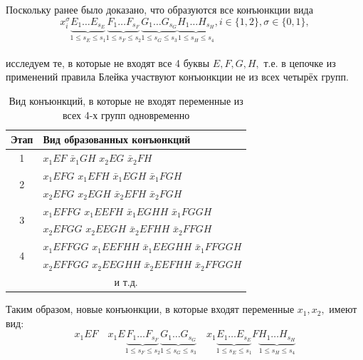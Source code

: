 \documentclass[12pt,a4paper,oneside,fleqn,leqno]{article}
\theoremstyle{definition}
\begin{document}
			Поскольку ранее было доказано, что образуются все конъюнкции вида
			\begin{equation}
				x_i^{\sigma} \underbrace{E_1\ldots E_{s_E}}_{1\leqslant s_E \leqslant s_1}\underbrace{F_1\ldots F_{s_F}}_{1\leqslant s_F \leqslant s_2}\underbrace{G_1\ldots G_{s_G}}_{1\leqslant s_G \leqslant s_3}\underbrace{H_1\ldots H_{s_H}}_{1\leqslant s_H \leqslant s_4}, i\in\{1,2\},\sigma\in\{0,1\},
			\end{equation}\\
			исследуем те, в которые не входят все 4 буквы $E, F, G, H,$ т.е. в цепочке из применений правила Блейка участвуют конъюнкции не из всех четырёх групп.
			\begin{table}[H]
				\centering
				\begin{tabular}{|c|p{4in}|}
					\hline
					Этап & Вид образованных конъюнкций\\
					\hline
					1 & $x_1EF$ $\bar{x}_1GH$ $x_2EG$ $\bar{x}_2FH$\\
					\hline
					\multirow{2}{*}{2} & $x_1EFG$ $x_1EFH$ $\bar{x}_1EGH$ $\bar{x}_1FGH$ \vspace{5pt}\\
					 & $x_2EFG$ $x_2EGH$ $\bar{x}_2EFH$ $\bar{x}_2FGH$\\
					\hline
					\multirow{2}{*}{3} & $x_1EFFG$ $x_1EEFH$ $\bar{x}_1EGHH$ $\bar{x}_1FGGH$ \vspace{5pt}\\
					 & $x_2EFGG$ $x_2EEGH$ $\bar{x}_2EFHH$ $\bar{x}_2FFGH$\\
					\hline
					\multirow{2}{*}{4} & $x_1EFFGG$ $x_1EEFHH$ $\bar{x}_1EEGHH$ $\bar{x}_1FFGGH$ \vspace{5pt}\\
					 & $x_2EFFGG$ $x_2EEGHH$ $\bar{x}_2EEFHH$ $\bar{x}_2FFGGH$\\
					\hline
					\multicolumn{2}{|c|}{и т.д.}\\
					\hline
				\end{tabular}
				\captionsetup{justification=centering}
				\caption{Вид конъюнкций, в которые не входят переменные из всех 4-х групп одновременно}
			\end{table}\par
			Таким образом, новые конъюнкции, в которые входят переменные $x_1, x_2,$ имеют вид:
			$$
				x_1EF \quad x_1E\underbrace{F_1\ldots F_{s_F}}_{1 \leqslant s_F \leqslant s_2}\underbrace{G_1\ldots G_{s_G}}_{1 \leqslant s_G \leqslant s_3} \quad x_1\underbrace{E_1\ldots E_{s_E}}_{1 \leqslant s_E \leqslant s_1}F\underbrace{H_1\ldots H_{s_H}}_{1 \leqslant s_H \leqslant s_4}
			$$
\end{document}
